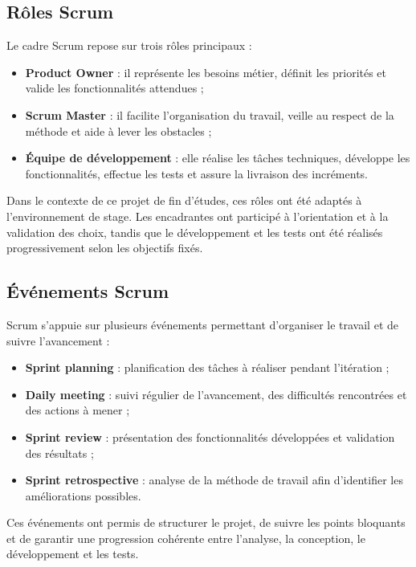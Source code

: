 \documentclass[12pt,a4paper]{report}
\begin{document}
\subsection{Rôles Scrum}
Le cadre Scrum repose sur trois rôles principaux :
\begin{itemize}
    \item \textbf{Product Owner} : il représente les besoins métier, définit les priorités et valide les fonctionnalités attendues ;
    \item \textbf{Scrum Master} : il facilite l'organisation du travail, veille au respect de la méthode et aide à lever les obstacles ;
    \item \textbf{Équipe de développement} : elle réalise les tâches techniques, développe les fonctionnalités, effectue les tests et assure la livraison des incréments.
\end{itemize}

Dans le contexte de ce projet de fin d'études, ces rôles ont été adaptés à l'environnement de stage. Les encadrantes ont participé à l'orientation et à la validation des choix, tandis que le développement et les tests ont été réalisés progressivement selon les objectifs fixés.

\subsection{Événements Scrum}
Scrum s'appuie sur plusieurs événements permettant d'organiser le travail et de suivre l'avancement :
\begin{itemize}
    \item \textbf{Sprint planning} : planification des tâches à réaliser pendant l'itération ;
    \item \textbf{Daily meeting} : suivi régulier de l'avancement, des difficultés rencontrées et des actions à mener ;
    \item \textbf{Sprint review} : présentation des fonctionnalités développées et validation des résultats ;
    \item \textbf{Sprint retrospective} : analyse de la méthode de travail afin d'identifier les améliorations possibles.
\end{itemize}

Ces événements ont permis de structurer le projet, de suivre les points bloquants et de garantir une progression cohérente entre l'analyse, la conception, le développement et les tests.
\end{document}
